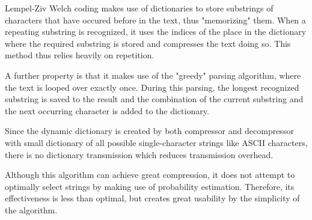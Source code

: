 Lempel-Ziv Welch coding makes use of dictionaries to store substrings of characters that have occured before in the text, thus "memorizing" them. When a repeating substring is recognized, it uses the indices of the place in the dictionary where the required substring is stored and compresses the text doing so. This method thus relies heavily on repetition. 

\vspace{10pt}
A further property is that it makes use of the "greedy" parsing algorithm, where the text is looped over exactly once. During this parsing, the longest recognized substring is saved to the result and the combination of the current substring and the next occurring character is added to the dictionary.

\vspace{10pt}
Since the dynamic dictionary is created by both compressor and decompressor with small dictionary of all possible single-character strings like ASCII characters, there is no dictionary transmission which reduces transmission overhead. 

\vspace{10pt}
Although this algorithm can achieve great compression, it does not attempt to optimally select strings by making use of probability estimation. Therefore, its effectiveness is less than optimal, but creates great usability by the simplicity of the algorithm.

